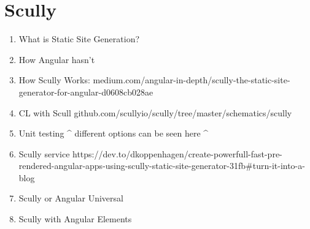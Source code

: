 \chapter{ Scully }
\begin{enumerate}
  \item What is Static Site Generation?
  \item How Angular hasn't 
  \item How Scully Works: medium.com/angular-in-depth/scully-the-static-site-generator-for-angular-d0608cb028ae
  \item CL with Scull 
  github.com/scullyio/scully/tree/master/schematics/scully
  \item Unit testing
  ^ different options can be seen here ^
  \item Scully service
  https://dev.to/dkoppenhagen/create-powerfull-fast-pre-rendered-angular-apps-using-scully-static-site-generator-31fb#turn-it-into-a-blog
  \item Scully or Angular Universal 
  \item Scully with Angular Elements 
\end{enumerate}